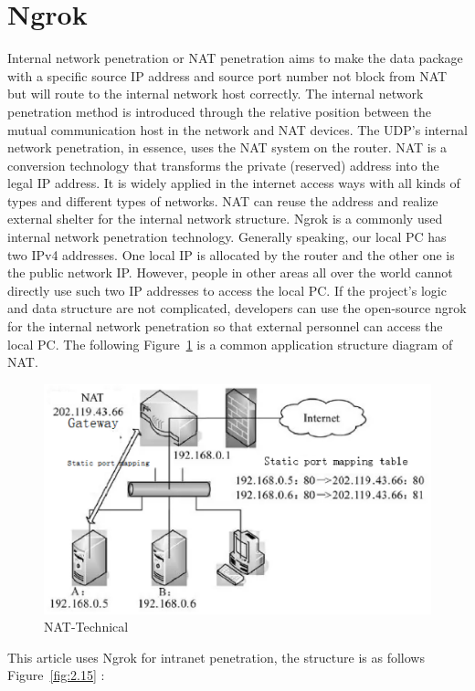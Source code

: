\section{Ngrok}
\label{sec:Ngrok}
Internal network penetration or NAT penetration aims to make the data package with a specific source IP address and source port number not block from NAT but will route to the internal network host correctly. The internal network penetration method is introduced through the relative position between the mutual communication host in the network and NAT devices. 
The UDP’s internal network penetration, in essence, uses the NAT system on the router. NAT is a conversion technology that transforms the private (reserved) address into the legal IP address. It is widely applied in the internet access ways with all kinds of types and different types of networks. NAT can reuse the address and realize external shelter for the internal network structure. 
Ngrok is a commonly used internal network penetration technology. Generally speaking, our local PC has two IPv4 addresses. One local IP is allocated by the router and the other one is the public network IP. However, people in other areas all over the world cannot directly use such two IP addresses to access the local PC. If the project’s logic and data structure are not complicated, developers can use the open-source ngrok for the internal network penetration so that external personnel can access the local PC. 
The following Figure~\ref{fig:2.14}  is a common application structure diagram of NAT.
\begin{figure}[!ht]
	\centering
	\includegraphics {grafiken/2.14.eps}
	\caption{NAT-Technical} 
	\label{fig:2.14}
\end{figure}
\FloatBarrier
This article uses Ngrok for intranet penetration, the structure is as follows Figure~\ref{fig:2.15} :


